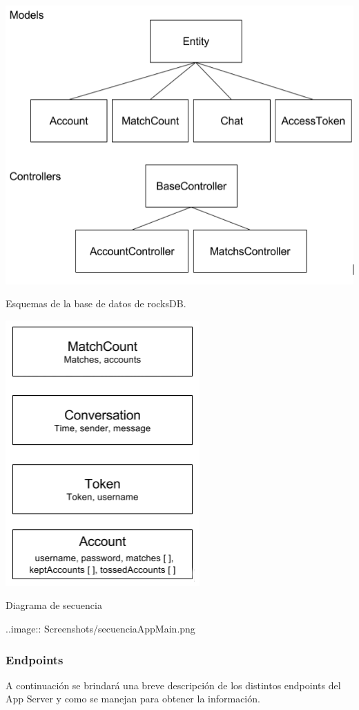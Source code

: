 \documentclass[letterpaper,10pt,english]{sphinxmanual}
\begin{document}
\includegraphics{classesapp.png}

Esquemas de la base de datos de rocksDB.

\includegraphics{rocksdb.png}

Diagrama de secuencia

..image:: Screenshots/secuenciaAppMain.png


\subsubsection{Endpoints}
\label{manuals:endpoints}
A continuación se brindará una breve descripción de los distintos endpoints del App Server y como se manejan para obtener la información.
\end{document}
